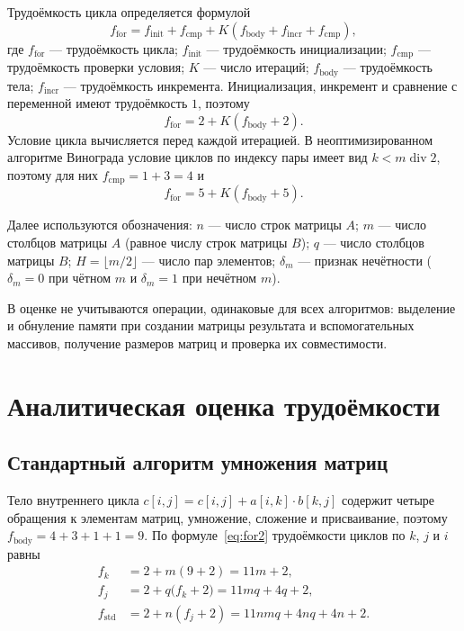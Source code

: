 \documentclass{bmstu}
\begin{document}
Трудоёмкость цикла определяется формулой
\begin{equation}
	\label{eq:for}
	f_{\mathrm{for}} =
	f_{\mathrm{init}} + f_{\mathrm{cmp}} +
	K \left(f_{\mathrm{body}} + f_{\mathrm{incr}} +
	f_{\mathrm{cmp}}\right),
\end{equation}
где $f_{\mathrm{for}}$ --- трудоёмкость цикла;
$f_{\mathrm{init}}$ --- трудоёмкость инициализации;
$f_{\mathrm{cmp}}$ --- трудоёмкость проверки условия;
$K$ --- число итераций;
$f_{\mathrm{body}}$ --- трудоёмкость тела;
$f_{\mathrm{incr}}$ --- трудоёмкость инкремента.
Инициализация, инкремент и сравнение с переменной имеют трудоёмкость $1$,
поэтому
\begin{equation}
	\label{eq:for2}
	f_{\mathrm{for}} = 2 + K \left(f_{\mathrm{body}} + 2\right).
\end{equation}
Условие цикла вычисляется перед каждой итерацией. В неоптимизированном
алгоритме Винограда условие циклов по индексу пары имеет вид
$k < m \;\mathrm{div}\; 2$, поэтому для них $f_{\mathrm{cmp}}=1+3=4$ и
\begin{equation}
	\label{eq:for4}
	f_{\mathrm{for}} = 5 + K \left(f_{\mathrm{body}} + 5\right).
\end{equation}

Далее используются обозначения: $n$ --- число строк матрицы $A$; $m$ ---
число столбцов матрицы $A$ (равное числу строк матрицы $B$); $q$ --- число
столбцов матрицы $B$; $H=\lfloor m/2\rfloor$ --- число пар элементов;
$\delta_m$ --- признак нечётности ($\delta_m=0$ при чётном $m$ и
$\delta_m=1$ при нечётном $m$).

В оценке не учитываются операции, одинаковые для всех алгоритмов:
выделение и обнуление памяти при создании матрицы результата и
вспомогательных массивов, получение размеров матриц и проверка их
совместимости.

\section{Аналитическая оценка трудоёмкости}

\subsection{Стандартный алгоритм умножения матриц}
Тело внутреннего цикла $c[i,j] = c[i,j] + a[i,k]\cdot b[k,j]$ содержит
четыре обращения к элементам матриц, умножение, сложение и присваивание,
поэтому $f_{\mathrm{body}}=4+3+1+1=9$. По формуле~\eqref{eq:for2}
трудоёмкости циклов по $k$, $j$ и $i$ равны
\begin{align}
	f_k              & = 2+m(9+2)=11m+2,                 \\
	f_j              & = 2+q\bigl(f_k+2\bigr)=11mq+4q+2, \\
	f_{\mathrm{std}} & = 2+n(f_j+2)=11nmq+4nq+4n+2.
	\label{eq:std}
\end{align}
\end{document}
